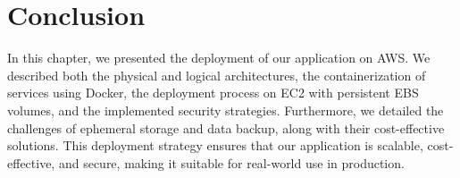 \section*{Conclusion}
In this chapter, we presented the deployment of our application on
AWS. We described both the physical and logical architectures, the
containerization of services using Docker, the deployment process on
EC2 with persistent EBS volumes, and the implemented security
strategies. Furthermore, we detailed the challenges of ephemeral storage and data backup, along with their cost-effective solutions. This deployment strategy ensures that our application is
scalable, cost-effective, and secure, making it suitable for real-world
use in production.
